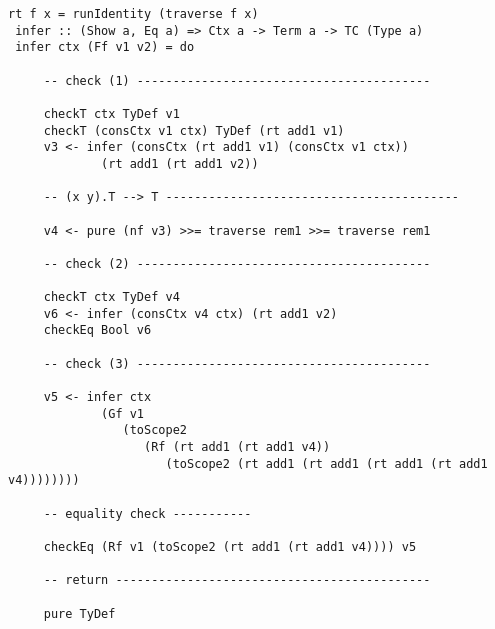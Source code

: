 \begin{lstlisting}[caption={Искусственный пример случая несоответствия контекстов: контекст t нужно сократить до использования в предпосылке.},label={FRule},captionpos=b, frame=single, float, floatplacement=H]
 rt f x = runIdentity (traverse f x)
 infer :: (Show a, Eq a) => Ctx a -> Term a -> TC (Type a)
 infer ctx (Ff v1 v2) = do

     -- check (1) -----------------------------------------

     checkT ctx TyDef v1
     checkT (consCtx v1 ctx) TyDef (rt add1 v1)
     v3 <- infer (consCtx (rt add1 v1) (consCtx v1 ctx))
             (rt add1 (rt add1 v2))

     -- (x y).T --> T -----------------------------------------

     v4 <- pure (nf v3) >>= traverse rem1 >>= traverse rem1

     -- check (2) -----------------------------------------

     checkT ctx TyDef v4
     v6 <- infer (consCtx v4 ctx) (rt add1 v2)
     checkEq Bool v6

     -- check (3) -----------------------------------------

     v5 <- infer ctx
             (Gf v1
                (toScope2
                   (Rf (rt add1 (rt add1 v4))
                      (toScope2 (rt add1 (rt add1 (rt add1 (rt add1 v4))))))))

     -- equality check -----------

     checkEq (Rf v1 (toScope2 (rt add1 (rt add1 v4)))) v5

     -- return --------------------------------------------

     pure TyDef
\end{lstlisting}
